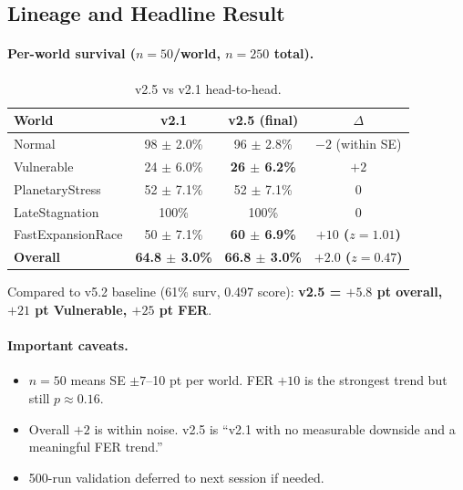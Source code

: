 \subsection{Lineage and Headline Result}
\label{sec:methodology-v25-headline}


\paragraph{Per-world survival ($n = 50$/world, $n = 250$ total).}

\begin{table}[ht]
\centering
\small
\begin{tabularx}{\linewidth}{Xccc}
\toprule
\textbf{World} & \textbf{v2.1} & \textbf{v2.5 (final)} &
\textbf{$\Delta$} \\
\midrule
Normal & 98 $\pm$ 2.0\% & 96 $\pm$ 2.8\% & $-2$ (within SE) \\
Vulnerable & 24 $\pm$ 6.0\% & \textbf{26 $\pm$ 6.2\%} & $+2$ \\
PlanetaryStress & 52 $\pm$ 7.1\% & 52 $\pm$ 7.1\% & 0 \\
LateStagnation & 100\% & 100\% & 0 \\
FastExpansionRace & 50 $\pm$ 7.1\% & \textbf{60 $\pm$ 6.9\%}
& \textbf{$+10$ ($z = 1.01$)} \\
\midrule
\textbf{Overall} & \textbf{64.8 $\pm$ 3.0\%} & \textbf{66.8 $\pm$ 3.0\%}
& \textbf{$+2.0$ ($z = 0.47$)} \\
\bottomrule
\end{tabularx}
\caption[v2.5 headline result]{v2.5 vs v2.1 head-to-head.}
\label{tab:methodology-v25-headline}
\end{table}

Compared to v5.2 baseline (61\% surv, 0.497 score):
\textbf{v2.5 = $+5.8$ pt overall, $+21$ pt Vulnerable,
$+25$ pt FER}.

\paragraph{Important caveats.}

\begin{itemize}
\item $n = 50$ means SE $\pm 7$--10 pt per world. FER $+10$ is the
strongest trend but still $p \approx 0.16$.
\item Overall $+2$ is within noise. v2.5 is ``v2.1 with no
measurable downside and a meaningful FER trend.''
\item 500-run validation deferred to next session if needed.
\end{itemize}

